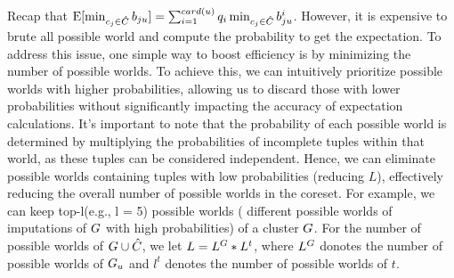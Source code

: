 Recap that $\mathrm{E}[\min_{c_j\in \hat {C}}b_{ju}] = \sum_{i=1}^{card(u)} q_i \min_{c_j \in \hat{C}} b_{ju}^i$. However, it is expensive to brute all possible world and compute the probability to get the expectation. To address this issue, one simple way to boost efficiency is by minimizing the number of possible worlds. To achieve this, we can intuitively prioritize possible worlds with higher probabilities, allowing us to discard those with lower probabilities without significantly impacting the accuracy of expectation calculations. It's important to note that the probability of each possible world is determined by multiplying the probabilities of incomplete tuples within that world, as these tuples can be considered independent. Hence, we can eliminate possible worlds containing tuples with low probabilities (\ie reducing $L$), effectively reducing the overall number of possible worlds in the coreset. For example, we can keep top-l(e.g., l = 5) possible worlds ( different possible worlds of imputations of $G$ with high probabilities) of a cluster $G$. For the number of possible worlds of $G \cup \hat{C}$, we let $L = L^{G} * L^t$, where $L^{G}$ donotes the number of possible worlds of $G_u$ and $l^t$ denotes the number of possible worlds of $t$.



